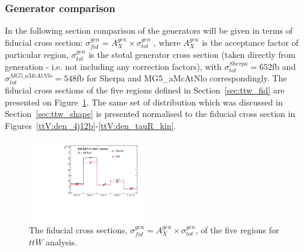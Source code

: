%
%
%
%
%
\subsubsection{Generator comparison}
\label{sec:ttw_gen}

In the following section comparison of the generators will be given in terms of fiducial cross section: 
$\sigma_{fid}^{gen}=A_X^{gen}\times \sigma_{tot}^{gen}$ , where $A_X^{gen}$ is the acceptance factor of particular region, $\sigma_{tot}^{gen}$ is the stotal generator cross section (taken directly from generation - i.e. not including any correction factors), with  $\sigma_{tot}^{Sherpa}=652$fb and  $\sigma_{tot}^{MG5\_aMcAtNlo}=548$fb for Sherpa and MG5\_aMcAtNlo correspondingly. The fiducial cross sections of the five regions defined in Section~\ref{sec:ttw_fid} are presented on Figure~\ref{ttV:fid_xs}.
The same set of distribution which was discussed in Section~\ref{sec:ttw_shape} is presented normalised to the fiducial cross section in Figures~\ref{ttV:den_4j12b}-\ref{ttV:den_tauR_kin}.

\begin{figure}[!htb]
\centering
\includegraphics[width=0.45\textwidth]{Plots/ttV/generator/acc_7f}
  \caption{The fiducial cross sections, $\sigma_{fid}^{gen}=A_X^{gen}\times \sigma_{tot}^{gen}$,  of the five regions for $ttW$ analysis. \label{ttV:fid_xs}}
\end{figure}


